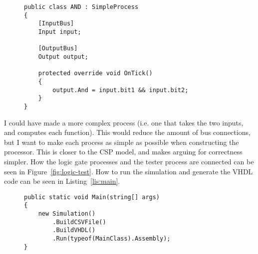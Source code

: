 \lstset{language=[Sharp]C}
\noindent
\begin{figure}
\begin{lstlisting}[caption=The SME process for the \texttt{AND} gate., captionpos=b, label=lis:andproc]
public class AND : SimpleProcess
{
    [InputBus]
    Input input;

    [OutputBus]
    Output output;

    protected override void OnTick()
    {
        output.And = input.bit1 && input.bit2;
    }
}
\end{lstlisting}
\end{figure}

I could have made a more complex process (i.e. one that takes the two inputs,
and computes each function). This would reduce the amount of bus connections,
but I want to make each process as simple as possible when constructing the
processor. This is closer to the CSP model, and makes arguing for correctness
simpler. How the logic gate processes and the tester process are connected can
be seen in Figure~\ref{fig:logic-test}. How to run the simulation and generate
the VHDL code can be seen in Listing~\ref{lis:main}.

\begin{figure}
\begin{lstlisting}[caption={The \texttt{Main} function for running an SME simulation, generating the CSV trace file and generating the VHDL code.}, label=lis:main, captionpos=b]
public static void Main(string[] args)
{
    new Simulation()
        .BuildCSVFile()
        .BuildVHDL()
        .Run(typeof(MainClass).Assembly);
}
\end{lstlisting}
\end{figure}

